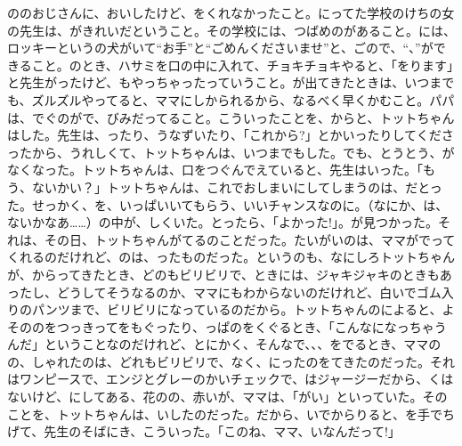 ののおじさんに、おいしたけど、をくれなかったこと。にってた学校のけちの女の先生は、がきれいだということ。その学校には、つばめのがあること。には、ロッキーというの犬がいて“お手”と“ごめんくださいませ”と、ごので、“、”ができること。のとき、ハサミを口の中に入れて、チョキチョキやると、「をります」と先生がったけど、もやっちゃったっていうこと。が出てきたときは、いつまでも、ズルズルやってると、ママにしかられるから、なるべく早くかむこと。パパは、でぐのがで、びみだってること。こういったことを、からと、トットちゃんはした。先生は、ったり、うなずいたり、「これから?」とかいったりしてくださったから、うれしくて、トットちゃんは、いつまでもした。でも、とうとう、がなくなった。トットちゃんは、口をつぐんでえていると、先生はいった。「もう、ないかい？」トットちゃんは、これでおしまいにしてしまうのは、だとった。せっかく、を、いっぱいいてもらう、いいチャンスなのに。（なにか、は、ないかなあ……）の中が、しくいた。とったら、「よかった!」。が見つかった。それは、その日、トットちゃんがてるのことだった。たいがいのは、ママがでってくれるのだけれど、のは、ったものだった。というのも、なにしろトットちゃんが、からってきたとき、どのもビリビリで、ときには、ジャキジャキのときもあったし、どうしてそうなるのか、ママにもわからないのだけれど、白いでゴム入りのパンツまで、ビリビリになっているのだから。トットちゃんのによると、よそののをつっきってをもぐったり、っぱのをくぐるとき、「こんなになっちゃうんだ」ということなのだけれど、とにかく、そんなで、、、をでるとき、ママのの、しゃれたのは、どれもビリビリで、なく、にったのをてきたのだった。それはワンピースで、エンジとグレーのかいチェックで、はジャージーだから、くはないけど、にしてある、花のの、赤いが、ママは、「がい」といっていた。そのことを、トットちゃんは、いしたのだった。だから、いでからりると、を手でちげて、先生のそばにき、こういった。「このね、ママ、いなんだって!」

